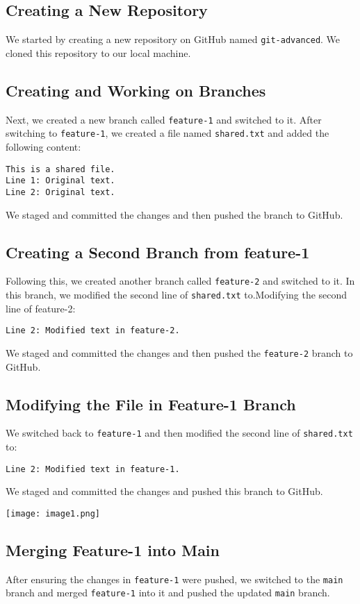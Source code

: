 \documentclass[a4paper,12pt]{article}
\begin{document}
\subsection{ Creating a New Repository}
We started by creating a new repository on GitHub named \texttt{git-advanced}. We cloned this repository to our local machine.

\subsection{ Creating and Working on Branches}
Next, we created a new branch called \texttt{feature-1} and switched to it. After switching to \texttt{feature-1}, we created a file named \texttt{shared.txt} and added the following content:
\begin{verbatim}
This is a shared file.
Line 1: Original text.
Line 2: Original text.
\end{verbatim}
We staged and committed the changes and then pushed the branch to GitHub.

\subsection{Creating a Second Branch from feature-1}
Following this, we created another branch called \texttt{feature-2} and switched to it. In this branch, we modified the second line of \texttt{shared.txt} to.Modifying the second line of feature-2:
\begin{verbatim}
Line 2: Modified text in feature-2.
\end{verbatim}
We staged and committed the changes and then pushed the \texttt{feature-2} branch to GitHub.

\subsection{Modifying the File in Feature-1 Branch}
We switched back to \texttt{feature-1} and then modified the second line of \texttt{shared.txt} to:
\begin{verbatim}
Line 2: Modified text in feature-1.
\end{verbatim}
We staged and committed the changes and pushed this branch to GitHub.

\begin{center}
\texttt{[image: image1.png]}
    \vspace{0.5cm}
\end{center}

\subsection{Merging Feature-1 into Main}
After ensuring the changes in \texttt{feature-1} were pushed, we switched to the \texttt{main} branch and merged \texttt{feature-1} into it and pushed the updated \texttt{main} branch.
\end{document}
